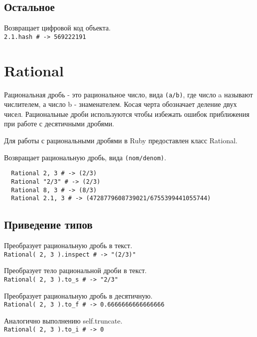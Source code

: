 \subsection*{Остальное}

\begin{methodlist}
  Возвращает цифровой код объекта.
  \\\verb!2.1.hash # -> 569222191!
\end{methodlist}

\section{Rational}

Рациональная дробь - это рациональное число, вида \verb!(a/b)!, где число a называют числителем, а число b - знаменателем. Косая черта обозначает деление двух чисел. Рациональные дроби используются чтобы избежать ошибок приближения при работе с десятичными дробями.

Для работы с рациональными дробями в Ruby предоставлен класс Rational. 

\begin{methodlist}
  Возвращает рациональную дробь, вида \verb!(nom/denom)!. 
  \begin{verbatim}
  Rational 2, 3 # -> (2/3) 
  Rational "2/3" # -> (2/3) 
  Rational 8, 3 # -> (8/3) 
  Rational 2.1, 3 # -> (4728779608739021/6755399441055744)
  \end{verbatim}
\end{methodlist}

\subsection*{Приведение типов}

\begin{methodlist}
  Преобразует рациональную дробь в текст. 
  \\\verb!Rational( 2, 3 ).inspect # -> "(2/3)"!

  Преобразует тело рациональной дроби в текст. 
  \\\verb!Rational( 2, 3 ).to_s # -> "2/3"!

  Преобразует рациональную дробь в десятичную. 
  \\\verb!Rational( 2, 3 ).to_f # -> 0.6666666666666666!

  Аналогично выполнению self.truncate.
  \\\verb!Rational( 2, 3 ).to_i # -> 0!

\end{methodlist}

